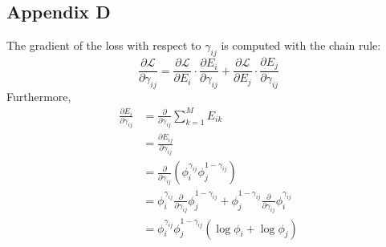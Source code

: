 \documentclass[12pt]{report}
\begin{document}
\subsection*{Appendix D}
The gradient of the loss with respect to $\gamma_{ij}$ is computed with the chain rule:
\begin{equation}
\frac{\partial \mathcal{L}}{\partial \gamma_{ij}} = \frac{\partial \mathcal{L}}{\partial E_i} \cdot \frac{\partial E_i}{\partial \gamma_{ij}} + \frac{\partial \mathcal{L}}{\partial E_j} \cdot \frac{\partial E_j}{\partial \gamma_{ij}} 
\end{equation}
Furthermore,
\begin{equation}
\begin{split}
\frac{\partial E_i}{\partial \gamma_{ij}} &= \frac{\partial}{\partial \gamma_{ij}} \sum_{k=1}^M E_{ik} \\
&= \frac{\partial E_{ij}}{\partial \gamma_{ij}} \\
&= \frac{\partial}{\partial \gamma_{ij}}(\phi_i^{\gamma_{ij}} \phi_j^{1-\gamma_{ij}})\\
&= \phi_i^{\gamma_{ij}}\frac{\partial}{\partial \gamma_{ij}}\phi_j^{1-\gamma_{ij}} + \phi_j^{1-\gamma_{ij}}\frac{\partial}{\partial \gamma_{ij}}\phi_i^{\gamma_{ij}}\\
&= \phi_i^{\gamma_{ij}}\phi_j^{1-\gamma_{ij}}(\log\phi_i + \log\phi_j)\\
\end{split}
\end{equation}
\clearpage



\end{document}
